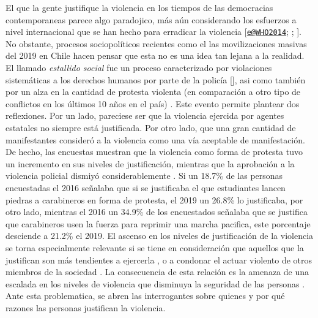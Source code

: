 \documentclass[12pt,twoside]{templates/facsothesis}
\begin{document}
El que la gente justifique la violencia en los tiempos de las democracias contemporaneas parece algo paradojico, más aún considerando los esfuerzos a nivel internacional que se han hecho para erradicar la violencia {[}\href{mailto:e@WHO2014}{\nolinkurl{e@WHO2014}}; \citet{WHO2010}; \citet{WHO2009}{]}. No obstante, procesos sociopolíticos recientes como el las movilizaciones masivas del 2019 en Chile hacen pensar que esta no es una idea tan lejana a la realidad. El llamado \emph{estallido social} fue un proceso caracterizado por violaciones sistemáticas a los derechos humanos por parte de la policía {[}{]}, asi como también por un alza en la cantidad de protesta violenta (en comparación a otro tipo de conflictos en los últimos 10 años en el país) \citep{Joignant2020}. Este evento permite plantear dos reflexiones. Por un lado, pareciese ser que la violencia ejercida por agentes estatales no siempre está justificada. Por otro lado, que una gran cantidad de manifestantes consideró a la violencia como una vía aceptable de manifestación. De hecho, las encuestas muestran que la violencia como forma de protesta tuvo un incremento en sus niveles de justificación, mientras que la aprobación a la violencia policial dismiyó considerablemente \citep{ELSOC2019}. Si un 18.7\% de las personas encuestadas el 2016 señalaba que si se justificaba el que estudiantes lancen piedras a carabineros en forma de protesta, el 2019 un 26.8\% lo justificaba, por otro lado, mientras el 2016 un 34.9\% de los encuestados señalaba que se justifica que carabineros usen la fuerza para reprimir una marcha pacifica, este porcentaje desciende a 21.2\% el 2019. El ascenso en los niveles de justificación de la violencia se torna especialmente relevante si se tiene en consideración que aquellos que la justifican son más tendientes a ejercerla \citep{Markowitz2001}, o a condonar el actuar violento de otros miembros de la sociedad \citep{Kalmoe2014}. La consecuencia de esta relación es la amenaza de una escalada en los niveles de violencia que disminuya la seguridad de las personas \citep{Gerber2017}. Ante esta problematica, se abren las interrogantes sobre quienes y por qué razones las personas justifican la violencia.
\end{document}
